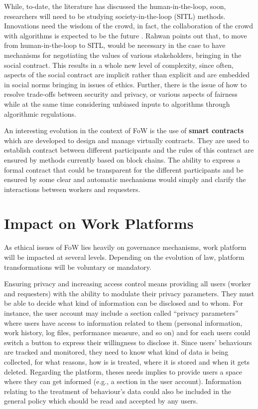 \documentclass[11pt]{article}
\begin{document}
While, to-date, the literature has discussed the human-in-the-loop, soon, researchers will need to be studying society-in-the-loop (SITL) \cite{rahwan2018society} methods. Innovations need the wisdom of the crowd, in fact, the collaboration of the crowd with algorithms is expected to be the future \cite{malone2018human}. Rahwan \cite{rahwan2018society} points out that, to move from human-in-the-loop to SITL,  would be necessary in the case  to have mechanisms for negotiating the values of various stakeholders, bringing in the social contract. This results in a whole new level of complexity, since often, aspects of the social contract are implicit rather than explicit and are embedded in social norms bringing in issues of ethics. Further, there is the issue of how to resolve trade-offs between security and privacy, or various aspects of fairness while at the same time considering unbiased inputs to algorithms through algorithmic regulations. 


An interesting evolution in the context of FoW is the use of \textbf{smart contracts} which are developed to design and manage virtually contracts. They are used to establish contract between different participants and the rules of this contract are ensured by methods currently based on block chains. The ability to express a formal contract that could be transparent for the different participants and be ensured by some clear and automatic mechanisms would simply and clarify the interactions between workers and requesters. 


\section{Impact on Work Platforms}
As ethical issues of FoW lies heavily on governance mechanisms, work platform will be impacted at several levels. Depending on the evolution of law, platform transformations will be voluntary or mandatory. 

Ensuring privacy and increasing access control means providing all users (worker and requesters) with the ability to modulate their privacy parameters. They must be able to decide what kind of information can be disclosed and to whom. For instance, the user account may include a section called ``privacy parameters'' where users have access to  information related to them (personal information, work history, log files, performance measure, and so on) and for each users could switch a button to express their willingness to disclose it. Since users' behaviours are tracked and monitored, they need to know what kind of data is being collected, for what reasons, how is is treated, where it is stored and when it gets deleted. Regarding the platform, theses needs implies to provide users a space where they can get informed (e.g., a section in the user account). Information relating to the treatment of behaviour’s data could also be included in the general policy which should be read and accepted by any users. 
\end{document}

